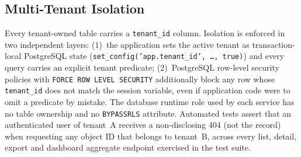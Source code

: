 \subsection{Multi-Tenant Isolation}
Every tenant-owned table carries a \texttt{tenant\_id} column. Isolation is
enforced in two independent layers: (1)~the application sets the active
tenant as transaction-local PostgreSQL state
(\texttt{set\_config('app.tenant\_id', \dots, true)}) and every query carries
an explicit tenant predicate; (2)~PostgreSQL row-level security policies with
\texttt{FORCE ROW LEVEL SECURITY} additionally block any row whose
\texttt{tenant\_id} does not match the session variable, even if application
code were to omit a predicate by mistake. The database runtime role used by
each service has no table ownership and no \texttt{BYPASSRLS} attribute.
Automated tests assert that an authenticated user of tenant~A receives a
non-disclosing 404 (not the record) when requesting any object ID that
belongs to tenant~B, across every list, detail, export and dashboard
aggregate endpoint exercised in the test suite.

